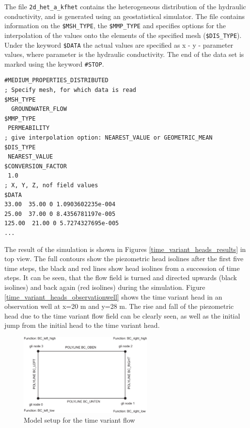 The file \texttt{2d\_het\_a\_kfhet} contains the heterogeneous distribution of the hydraulic conductivity, and is generated using an geostatistical simulator. The file contains information on the \texttt{\$MSH\_TYPE}, the \texttt{\$MMP\_TYPE} and specifies options for the interpolation of the values onto the elements of the specified mesh (\texttt{\$DIS\_TYPE}). Under the keyword \texttt{\$DATA} the actual values are specified as x - y - parameter values, where parameter is the hydraulic conductivity. The end of the data set is marked using the keyword \texttt{\#STOP}.

\small
\begin{verbatim}
#MEDIUM_PROPERTIES_DISTRIBUTED	
; Specify mesh, for which data is read
$MSH_TYPE
  GROUNDWATER_FLOW
$MMP_TYPE
 PERMEABILITY
; give interpolation option: NEAREST_VALUE or GEOMETRIC_MEAN
$DIS_TYPE
 NEAREST_VALUE
$CONVERSION_FACTOR
 1.0
; X, Y, Z, nof field values			
$DATA
33.00  35.00 0 1.0903602235e-004
25.00  37.00 0 8.4356781197e-005
125.00  21.00 0 5.7274327695e-005
...
\end{verbatim}
\normalsize




The result of the simulation is shown in Figures \ref{time_variant_heads_results} in top view. The full contours show the piezometric head isolines after the first five time steps, the black and red lines show head isolines from a succession of time steps. It can be seen, that the flow field is turned and directed upwards (black isolines) and back again (red isolines) during the simulation. Figure \ref{time_variant_heads_observationwell} shows the time variant head in an observation well at x=20 m and y=28 m. The rise and fall of the piezometric head due to the time variant flow field can be clearly seen, as well as the initial jump from the initial head to the time variant head.

\begin{figure}[htbp]
\centering
\includegraphics[width=0.6\textwidth]{H_GW/figures/time_variant_flow_setup.eps}
\caption{Model setup for the time variant flow}
\label{time_variant_flow_setup}
\end{figure}

